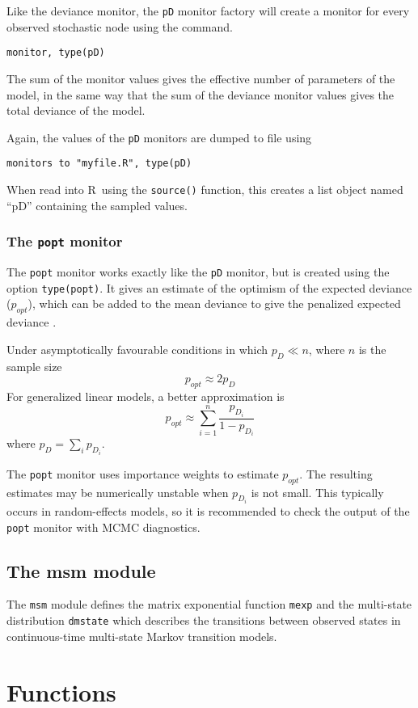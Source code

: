 \documentclass[11pt, a4paper, titlepage]{report}
\newcommand{\R}{\textsf{R}}
\begin{document}
Like the deviance monitor, the \verb+pD+ monitor factory will create a
monitor for every observed stochastic node using the command.
\begin{verbatim}
monitor, type(pD)
\end{verbatim}
The sum of the monitor values gives the effective number of parameters
of the model, in the same way that the sum of the deviance monitor
values gives the total deviance of the model. 

Again, the values of the \verb+pD+ monitors are dumped to file using
\begin{verbatim}
monitors to "myfile.R", type(pD)
\end{verbatim}
When read into \R\ using the \verb+source()+ function, this creates
a list object named ``pD'' containing the sampled values.

\subsection{The \texttt{popt} monitor}

The \verb+popt+ monitor works exactly like the \verb+pD+ monitor, but
is created using the option \verb+type(popt)+.  It gives an estimate
of the optimism of the expected deviance ($p_{opt}$), which can be
added to the mean deviance to give the penalized expected deviance
\cite{plummer:2008}.

Under asymptotically favourable conditions in which $p_D \ll n$, where
$n$ is the sample size
\[
p_{opt} \approx 2 p_D
\]
For generalized linear models, a better approximation is
\[
p_{opt} \approx \sum_{i=1}^n \frac {p_{D_i}}{1 - p_{D_i}}
\]
where $p_D = \sum_i p_{D_i}$.

The \verb+popt+ monitor uses importance weights to estimate
$p_{opt}$. The resulting estimates may be numerically unstable when
$p_{D_i}$ is not small.  This typically occurs in random-effects
models, so it is recommended to check the output of the \verb+popt+
monitor with MCMC diagnostics.

\section{The msm module}

The \verb+msm+ module defines the matrix exponential function
\verb+mexp+ and the multi-state distribution \verb+dmstate+ which
describes the transitions between observed states in continuous-time
multi-state Markov transition models. 

\chapter{Functions}
\label{section:functions}
\end{document}
